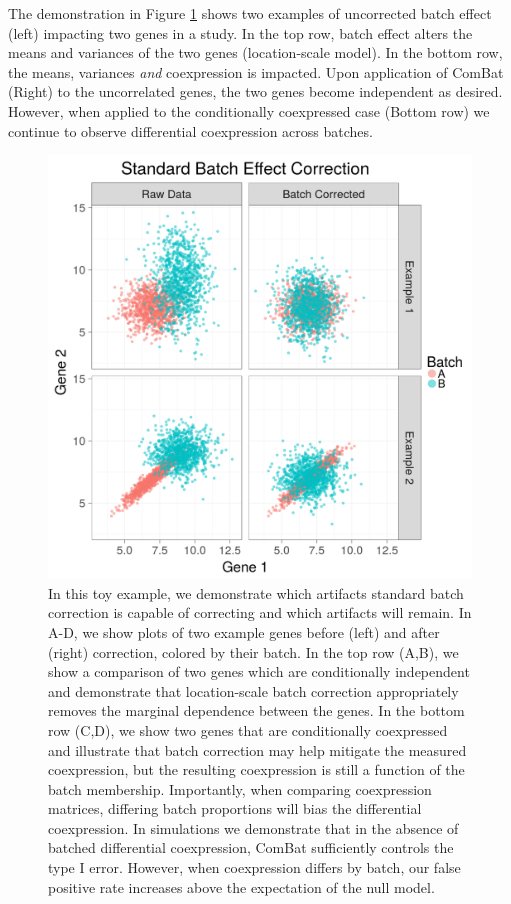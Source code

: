 The demonstration in Figure \ref{simulated_example} shows two examples
of uncorrected batch effect (left) impacting two genes in a study.
In the top row, batch effect alters the means and variances of the
two genes (location-scale model). In the bottom row, the means, variances
\emph{and} coexpression is impacted. Upon application of ComBat (Right)
to the uncorrelated genes, the two genes become independent as desired.
However, when applied to the conditionally coexpressed case (Bottom
row) we continue to observe differential coexpression across batches.

\begin{figure}
\includegraphics[width=1\columnwidth]{figures/simulated_example}\caption[Toy demonstration of impact of batch correction on coexpression]{In this toy example, we demonstrate which artifacts standard batch
correction is capable of correcting and which artifacts will remain.
In A-D, we show plots of two example genes before (left) and after
(right) correction, colored by their batch. In the top row (A,B),
we show a comparison of two genes which are conditionally independent
and demonstrate that location-scale batch correction appropriately
removes the marginal dependence between the genes. In the bottom row
(C,D), we show two genes that are conditionally coexpressed and illustrate
that batch correction may help mitigate the measured coexpression,
but the resulting coexpression is still a function of the batch membership.
Importantly, when comparing coexpression matrices, differing batch
proportions will bias the differential coexpression. In simulations
we demonstrate that in the absence of batched differential coexpression,
ComBat sufficiently controls the type I error. However, when coexpression
differs by batch, our false positive rate increases above the expectation
of the null model.}
\label{simulated_example}
\end{figure}

